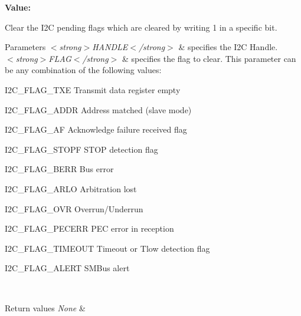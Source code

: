 {\bfseries Value\+:}
\begin{DoxyCode}{0}

\end{DoxyCode}


Clear the I2C pending flags which are cleared by writing 1 in a specific bit. 


\begin{DoxyParams}{Parameters}
{\em $<$strong$>$\+H\+A\+N\+D\+L\+E$<$/strong$>$} & specifies the I2C Handle. \\
\hline
{\em $<$strong$>$\+F\+L\+A\+G$<$/strong$>$} & specifies the flag to clear. This parameter can be any combination of the following values\+: \begin{DoxyItemize}
\item I2\+C\+\_\+\+F\+L\+A\+G\+\_\+\+T\+XE Transmit data register empty \item I2\+C\+\_\+\+F\+L\+A\+G\+\_\+\+A\+D\+DR Address matched (slave mode) \item I2\+C\+\_\+\+F\+L\+A\+G\+\_\+\+AF Acknowledge failure received flag \item I2\+C\+\_\+\+F\+L\+A\+G\+\_\+\+S\+T\+O\+PF S\+T\+OP detection flag \item I2\+C\+\_\+\+F\+L\+A\+G\+\_\+\+B\+E\+RR Bus error \item I2\+C\+\_\+\+F\+L\+A\+G\+\_\+\+A\+R\+LO Arbitration lost \item I2\+C\+\_\+\+F\+L\+A\+G\+\_\+\+O\+VR Overrun/\+Underrun \item I2\+C\+\_\+\+F\+L\+A\+G\+\_\+\+P\+E\+C\+E\+RR P\+EC error in reception \item I2\+C\+\_\+\+F\+L\+A\+G\+\_\+\+T\+I\+M\+E\+O\+UT Timeout or Tlow detection flag \item I2\+C\+\_\+\+F\+L\+A\+G\+\_\+\+A\+L\+E\+RT S\+M\+Bus alert\end{DoxyItemize}
\\
\hline
\end{DoxyParams}

\begin{DoxyRetVals}{Return values}
{\em None} & \\
\hline
\end{DoxyRetVals}
\mbox{\label{group___i2_c___exported___macros_ga3d6a35da02ca72537a15570912c80412}} 
